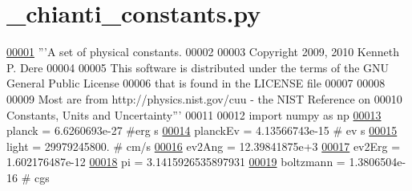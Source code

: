 \hypertarget{__chianti__constants_8py_source}{}\section{\+\_\+chianti\+\_\+constants.\+py}
\label{__chianti__constants_8py_source}

\begin{DoxyCode}
\hypertarget{__chianti__constants_8py_source_l00001}{}\hyperlink{namespacepyneb_1_1utils_1_1__chianti__constants}{00001} \textcolor{stringliteral}{'''A set of physical constants.}
00002 \textcolor{stringliteral}{}
00003 \textcolor{stringliteral}{Copyright 2009, 2010 Kenneth P. Dere}
00004 \textcolor{stringliteral}{}
00005 \textcolor{stringliteral}{This software is distributed under the terms of the GNU General Public License}
00006 \textcolor{stringliteral}{that is found in the LICENSE file}
00007 \textcolor{stringliteral}{}
00008 \textcolor{stringliteral}{}
00009 \textcolor{stringliteral}{Most are from http://physics.nist.gov/cuu - the NIST Reference on}
00010 \textcolor{stringliteral}{Constants, Units and Uncertainty'''}
00011 
00012 \textcolor{keyword}{import} numpy \textcolor{keyword}{as} np
\hypertarget{__chianti__constants_8py_source_l00013}{}\hyperlink{namespacepyneb_1_1utils_1_1__chianti__constants_a7a52a58fab4374274ebc5466bbd1b2a1}{00013} planck = 6.6260693e-27   \textcolor{comment}{#erg s}
\hypertarget{__chianti__constants_8py_source_l00014}{}\hyperlink{namespacepyneb_1_1utils_1_1__chianti__constants_ae1ab6400d7b260ee4a719f00435fc2ab}{00014} planckEv = 4.13566743e-15  \textcolor{comment}{# ev s}
\hypertarget{__chianti__constants_8py_source_l00015}{}\hyperlink{namespacepyneb_1_1utils_1_1__chianti__constants_a5c6837147cfe0f07141bf1566944dd9e}{00015} light = 29979245800.  \textcolor{comment}{# cm/s}
\hypertarget{__chianti__constants_8py_source_l00016}{}\hyperlink{namespacepyneb_1_1utils_1_1__chianti__constants_a847490e29d2f997f05813f55958d4edb}{00016} ev2Ang = 12.39841875e+3
\hypertarget{__chianti__constants_8py_source_l00017}{}\hyperlink{namespacepyneb_1_1utils_1_1__chianti__constants_a0c7ba0e50d6114898e5ede4ee5e6ffa9}{00017} ev2Erg = 1.602176487e-12
\hypertarget{__chianti__constants_8py_source_l00018}{}\hyperlink{namespacepyneb_1_1utils_1_1__chianti__constants_ad25c8208e2cf163e8bc97367e09e07a8}{00018} pi = 3.1415926535897931
\hypertarget{__chianti__constants_8py_source_l00019}{}\hyperlink{namespacepyneb_1_1utils_1_1__chianti__constants_a6ff0fc21098c2ae57403ff849add9d25}{00019} boltzmann = 1.3806504e-16  \textcolor{comment}{# cgs}

\end{DoxyCode}
